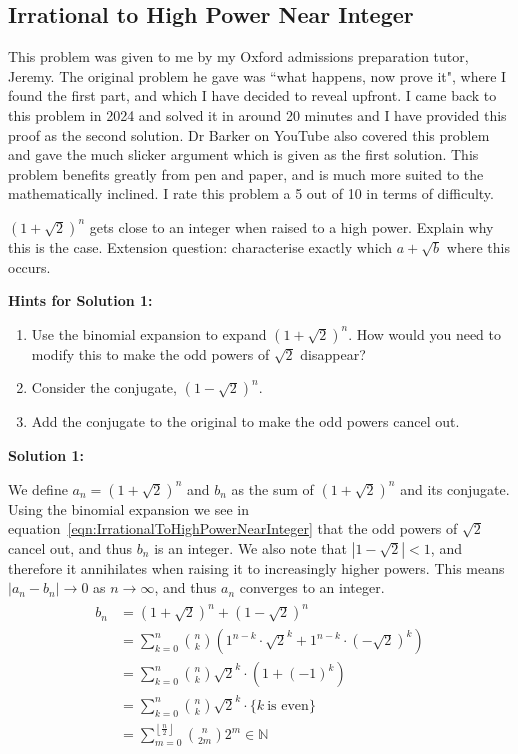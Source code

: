 \subsection{Irrational to High Power Near Integer}

This problem was given to me by my Oxford admissions preparation tutor, Jeremy. The original problem he gave was ``what happens, now prove it", where I found the first part, and which I have decided to reveal upfront. I came back to this problem in 2024 and solved it in around 20 minutes and I have provided this proof as the second solution. Dr Barker on YouTube also covered this problem and gave the much slicker argument which is given as the first solution. This problem benefits greatly from pen and paper, and is much more suited to the mathematically inclined. I rate this problem a 5 out of 10 in terms of difficulty.

$(1 + \sqrt{2})^n$ gets close to an integer when raised to a high power. Explain why this is the case. Extension question: characterise exactly which $a + \sqrt{b}$ where this occurs.

\textbf{Hints for Solution 1:}

\begin{enumerate}
    \item Use the binomial expansion to expand $\left( 1 + \sqrt{2} \right)^n$. How would you need to modify this to make the odd powers of $\sqrt{2}$ disappear?
    \item Consider the conjugate, $\left( 1 - \sqrt{2} \right)^n$.
    \item Add the conjugate to the original to make the odd powers cancel out.
\end{enumerate}

\textbf{Solution 1:}

We define $a_n = \left( 1 + \sqrt{2} \right)^n$ and $b_n$ as the sum of $\left (1 + \sqrt{2} \right)^n$ and its conjugate. Using the binomial expansion we see in equation~\eqref{eqn:IrrationalToHighPowerNearInteger} that the odd powers of $\sqrt{2}$ cancel out, and thus $b_n$ is an integer. We also note that $\left| 1 - \sqrt{2} \right| < 1$, and therefore it annihilates when raising it to increasingly higher powers. This means $|a_n - b_n| \to 0$ as $n \to \infty$, and thus $a_n$ converges to an integer.
\begin{align}
	\begin{split}
		b_n &= \left( 1 + \sqrt{2} \right)^n + \left( 1 - \sqrt{2} \right)^n  \\
		&= \sum_{k=0}^n {n \choose k} \left( 1^{n - k} \cdot \sqrt{2}^k + 1^{n - k} \cdot (-\sqrt{2})^k \right)  \\
		&= \sum_{k=0}^n {n \choose k} \sqrt{2}^k \cdot (1 + (-1)^k)  \\
		&= \sum_{k=0}^n {n \choose k} \sqrt{2}^k \cdot \{k \ \text{is even}\}  \\
		&= \sum_{m=0}^{\left\lfloor \frac{n}{2} \right\rfloor} {n \choose 2m} 2^m \in \mathbb{N}
		\label{eqn:IrrationalToHighPowerNearInteger}
	\end{split}	
\end{align}

